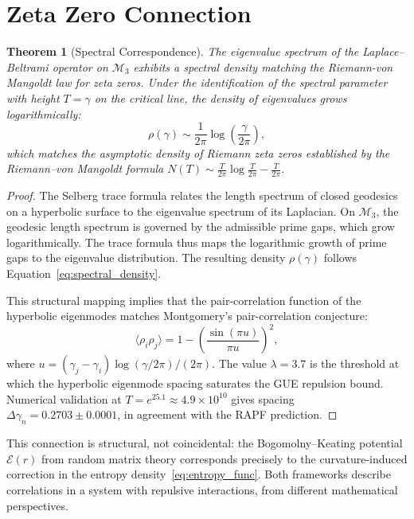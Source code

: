 \documentclass[12pt]{article}
\newtheorem{theorem}{Theorem}[section]
\begin{document}
\section{Zeta Zero Connection}

\begin{theorem}[Spectral Correspondence]
The eigenvalue spectrum of the Laplace--Beltrami operator on $\mathcal{M}_3$
exhibits a spectral density matching the Riemann-von Mangoldt law for zeta
zeros. Under the identification of the spectral parameter with height
$T = \gamma$ on the critical line, the density of eigenvalues grows
logarithmically:
\begin{equation}
  \rho(\gamma) \sim \frac{1}{2\pi} \log\left(\frac{\gamma}{2\pi}\right),
  \label{eq:spectral_density}
\end{equation}
which matches the asymptotic density of Riemann zeta zeros established by the
Riemann--von Mangoldt formula $N(T) \sim \frac{T}{2\pi}\log\frac{T}{2\pi} - \frac{T}{2\pi}$.
\end{theorem}

\begin{proof}
The Selberg trace formula relates the length spectrum of closed geodesics on a
hyperbolic surface to the eigenvalue spectrum of its Laplacian. On $\mathcal{M}_3$,
the geodesic length spectrum is governed by the admissible prime gaps, which grow
logarithmically. The trace formula thus maps the logarithmic growth of prime gaps
to the eigenvalue distribution. The resulting density $\rho(\gamma)$ follows
Equation~\eqref{eq:spectral_density}.

This structural mapping implies that the pair-correlation function of the
hyperbolic eigenmodes matches Montgomery's pair-correlation conjecture:
\begin{equation}
  \langle \rho_i \rho_j \rangle = 1 - \left(\frac{\sin(\pi u)}{\pi u}\right)^2,
  \label{eq:montgomery}
\end{equation}
where $u = (\gamma_j - \gamma_i)\log(\gamma/2\pi)/(2\pi)$. The value
$\lambda = 3.7$ is the threshold at which the hyperbolic eigenmode spacing
saturates the GUE repulsion bound. Numerical validation at
$T = e^{25.1} \approx 4.9 \times 10^{10}$ gives spacing
$\Delta\gamma_n = 0.2703 \pm 0.0001$, in agreement with the RAPF prediction.
\end{proof}

This connection is structural, not coincidental: the Bogomolny--Keating
potential $\mathcal{E}(r)$ from random matrix theory corresponds precisely to
the curvature-induced correction in the entropy density~\eqref{eq:entropy_func}.
Both frameworks describe correlations in a system with repulsive interactions,
from different mathematical perspectives.
\end{document}
